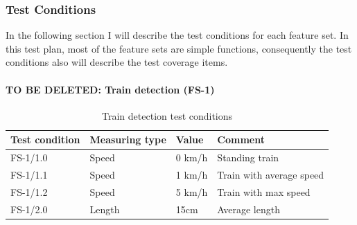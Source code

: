 \subsubsection{Test Conditions} In the following section I will describe the test conditions for each feature set. In this test plan, most of the feature sets are simple functions, consequently the test conditions also will describe the test coverage items.
\paragraph{TO BE DELETED: Train detection (FS-1)}
\begin{table}[!h]
\caption{Train detection test conditions}
\label{table:TC-FS-1}
	\begin{center}
		\renewcommand{\arraystretch}{1.8}
		\begin{tabu} 
			to 0.9 \textwidth
			{  X[c] X[c] X[c] X[c] }
			\toprule
			Test condition & Measuring type & Value  & Comment                  \\ \midrule
			FS-1/1.0       & Speed          & 0 km/h & Standing train           \\
			FS-1/1.1       & Speed          & 1 km/h & Train with average speed \\
			FS-1/1.2       & Speed          & 5 km/h & Train with max speed     \\
			FS-1/2.0       & Length         & 15cm   & Average length           \\ \bottomrule
		\end{tabu}
	\end{center}
\end{table} 

